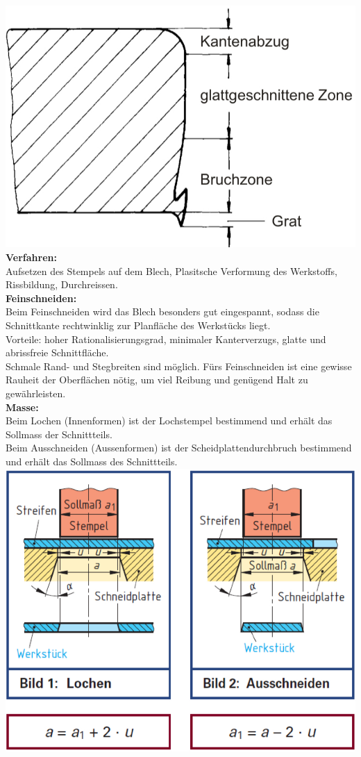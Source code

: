 \includegraphics[width=0.8\linewidth]{src/images/Stanzen.jpeg}\\
\textbf{Verfahren:}\\
Aufsetzen des Stempels auf dem Blech, Plasitsche Verformung des
Werkstoffs, Rissbildung, Durchreissen.\\

\textbf{Feinschneiden:}\\
Beim Feinschneiden wird das Blech besonders gut eingespannt, 
sodass die Schnittkante rechtwinklig zur Planfläche des Werkstücks 
liegt.\\
Vorteile: hoher Rationalisierungsgrad, minimaler Kanterverzugs, glatte und abrissfreie Schnittfläche.\\
Schmale Rand- und Stegbreiten sind möglich. Fürs Feinschneiden ist eine gewisse Rauheit der Oberflächen nötig, um viel Reibung und genügend Halt zu gewährleisten. \\

\textbf{Masse:}\\
Beim Lochen (Innenformen) ist der Lochstempel bestimmend 
und erhält das Sollmass der Schnittteils.\\
Beim Ausschneiden 
(Aussenformen) ist der Scheidplattendurchbruch bestimmend und 
erhält das Sollmass des Schnittteils.\\
\includegraphics[width=\linewidth]{src/images/Masse Stanzen.jpeg}
